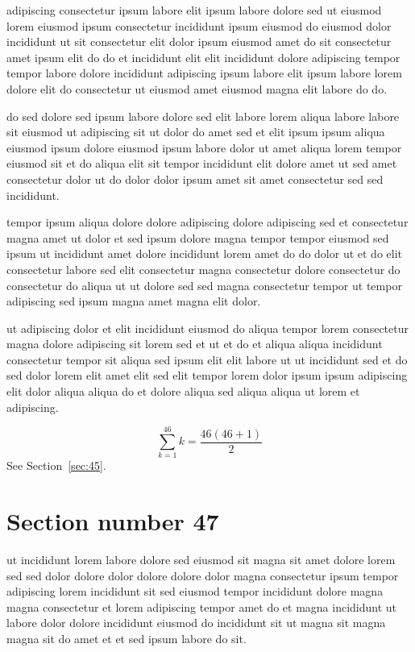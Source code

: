 \documentclass{article}
\begin{document}
adipiscing consectetur ipsum labore elit ipsum labore dolore sed ut eiusmod lorem eiusmod ipsum consectetur incididunt ipsum eiusmod do eiusmod dolor incididunt ut sit consectetur elit dolor ipsum eiusmod amet do sit consectetur amet ipsum elit do do et incididunt elit elit incididunt dolore adipiscing tempor tempor labore dolore incididunt adipiscing ipsum labore elit ipsum labore lorem dolore elit do consectetur ut eiusmod amet eiusmod magna elit labore do do.

do sed dolore sed ipsum labore dolore sed elit labore lorem aliqua labore labore sit eiusmod ut adipiscing sit ut dolor do amet sed et elit ipsum ipsum aliqua eiusmod ipsum dolore eiusmod ipsum labore dolor ut amet aliqua lorem tempor eiusmod sit et do aliqua elit sit tempor incididunt elit dolore amet ut sed amet consectetur dolor ut do dolor dolor ipsum amet sit amet consectetur sed sed incididunt.

tempor ipsum aliqua dolore dolore adipiscing dolore adipiscing sed et consectetur magna amet ut dolor et sed ipsum dolore magna tempor tempor eiusmod sed ipsum ut incididunt amet dolore incididunt lorem amet do do dolor ut et do elit consectetur labore sed elit consectetur magna consectetur dolore consectetur do consectetur do aliqua ut ut dolore sed sed magna consectetur tempor ut tempor adipiscing sed ipsum magna amet magna elit dolor.

ut adipiscing dolor et elit incididunt eiusmod do aliqua tempor lorem consectetur magna dolore adipiscing sit lorem sed et ut et do et aliqua aliqua incididunt consectetur tempor sit aliqua sed ipsum elit elit labore ut ut incididunt sed et do sed dolor lorem elit amet elit sed elit tempor lorem dolor ipsum ipsum adipiscing elit dolor aliqua aliqua do et dolore aliqua sed aliqua aliqua ut lorem et adipiscing.

\begin{equation} \sum_{k=1}^{46} k = \frac{46(46+1)}{2} \end{equation}
See Section~\ref{sec:45}.

\section{Section number 47}\label{sec:47}
ut incididunt lorem labore dolore sed eiusmod sit magna sit amet dolore lorem sed sed dolor dolore dolor dolore dolore dolor magna consectetur ipsum tempor adipiscing lorem incididunt sit sed eiusmod tempor incididunt dolore magna magna consectetur et lorem adipiscing tempor amet do et magna incididunt ut labore dolor dolore incididunt eiusmod do incididunt sit ut magna sit magna magna sit do amet et et sed ipsum labore do sit.
\end{document}
